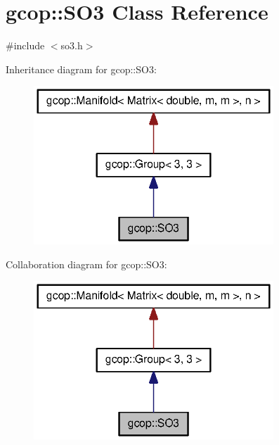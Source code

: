 \section{gcop\-:\-:\-S\-O3 \-Class \-Reference}
\label{classgcop_1_1SO3}


{\ttfamily \#include $<$so3.\-h$>$}



\-Inheritance diagram for gcop\-:\-:\-S\-O3\-:\nopagebreak
\begin{figure}[H]
\begin{center}
\leavevmode
\includegraphics[width=256pt]{classgcop_1_1SO3__inherit__graph}
\end{center}
\end{figure}


\-Collaboration diagram for gcop\-:\-:\-S\-O3\-:\nopagebreak
\begin{figure}[H]
\begin{center}
\leavevmode
\includegraphics[width=256pt]{classgcop_1_1SO3__coll__graph}
\end{center}
\end{figure}
